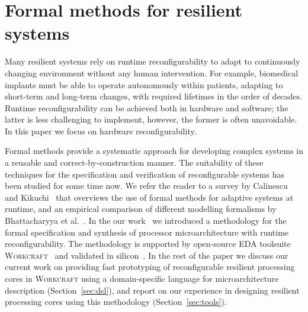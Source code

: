 \documentclass[conference]{IEEEtran}
\begin{document}
\IEEEpeerreviewmaketitle
\vspace{-1mm}
\section{Formal methods for resilient systems}
\vspace{-1mm}

Many resilient systems rely on runtime reconfigurability to adapt to
continuously changing environment without any human intervention. For example,
biomedical implants must be able to operate autonomously within patients,
adapting to short-term and long-term changes, with required lifetimes in the
order of decades. Runtime reconfigurability can be achieved both in hardware
and software; the latter is less challenging to implement, however, the former
is often unavoidable. In this paper we focus on hardware reconfigurability.

Formal methods provide a systematic approach for developing complex systems
in a reusable and correct-by-construction manner. The suitability of these
techniques for the specification and verification of reconfigurable
systems has been studied for some time now. We refer the reader to a survey by
Calinescu and Kikuchi~\cite{calinescu2010formal} that overviews the use of
formal methods for adaptive systems at runtime, and an empirical comparison
of different modelling formalisms by
Bhattacharyya et al.~\cite{DBLP:journals/corr/BhattacharyyaMP16}. In the our
work~\cite{ISA-formal} we introduced a methodology for the formal specification
and synthesis of processor microarchitecture with runtime reconfigurability.
The methodology is supported by open-source EDA toolsuite
\textsc{Workcraft}~\cite{workcraft_web} and validated in silicon~\cite{rec-proc}.
In the rest of the paper we discuss our current work on
providing fast prototyping of reconfigurable resilient processing cores in
\textsc{Workcraft} using a domain-specific language for
microarchitecture description (Section~\ref{sec:dsl}), and report on our
experience in designing resilient processing cores using this methodology
(Section~\ref{sec:tools}).

\end{document}
